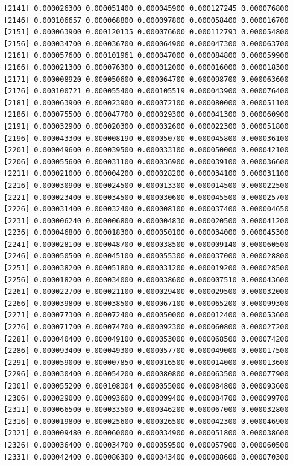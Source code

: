 \documentclass[]{article}
\begin{document}
\begin{verbatim}
 [2141] 0.000026300 0.000051400 0.000045900 0.000127245 0.000076800
 [2146] 0.000106657 0.000068800 0.000097800 0.000058400 0.000016700
 [2151] 0.000063900 0.000120135 0.000076600 0.000112793 0.000054800
 [2156] 0.000034700 0.000036700 0.000064900 0.000047300 0.000063700
 [2161] 0.000057600 0.000101961 0.000047000 0.000084800 0.000059900
 [2166] 0.000021300 0.000076300 0.000012000 0.000016000 0.000018300
 [2171] 0.000008920 0.000050600 0.000064700 0.000098700 0.000063600
 [2176] 0.000100721 0.000055400 0.000105519 0.000043900 0.000076400
 [2181] 0.000063900 0.000023900 0.000072100 0.000080000 0.000051100
 [2186] 0.000075500 0.000047700 0.000029300 0.000041300 0.000060900
 [2191] 0.000032900 0.000020300 0.000032600 0.000022300 0.000051800
 [2196] 0.000043300 0.000008190 0.000050700 0.000045800 0.000036100
 [2201] 0.000049600 0.000039500 0.000033100 0.000050000 0.000042100
 [2206] 0.000055600 0.000031100 0.000036900 0.000039100 0.000036600
 [2211] 0.000021000 0.000004200 0.000028200 0.000034100 0.000031100
 [2216] 0.000030900 0.000024500 0.000013300 0.000014500 0.000022500
 [2221] 0.000023400 0.000034500 0.000030600 0.000045500 0.000025700
 [2226] 0.000031400 0.000032400 0.000008100 0.000037400 0.000004650
 [2231] 0.000006240 0.000006800 0.000004830 0.000020500 0.000041200
 [2236] 0.000046800 0.000018300 0.000050100 0.000034000 0.000045300
 [2241] 0.000028100 0.000048700 0.000038500 0.000009140 0.000060500
 [2246] 0.000050500 0.000045100 0.000055300 0.000037000 0.000028800
 [2251] 0.000038200 0.000051800 0.000031200 0.000019200 0.000028500
 [2256] 0.000018200 0.000034000 0.000038600 0.000007510 0.000043600
 [2261] 0.000022700 0.000021100 0.000029400 0.000029500 0.000032000
 [2266] 0.000039800 0.000038500 0.000067100 0.000065200 0.000099300
 [2271] 0.000077300 0.000072400 0.000050000 0.000012400 0.000053600
 [2276] 0.000071700 0.000074700 0.000092300 0.000060800 0.000027200
 [2281] 0.000040400 0.000049100 0.000053000 0.000068500 0.000074200
 [2286] 0.000093400 0.000049300 0.000057700 0.000049000 0.000017500
 [2291] 0.000059000 0.000007850 0.000016500 0.000014000 0.000013600
 [2296] 0.000030400 0.000054200 0.000080800 0.000063500 0.000077900
 [2301] 0.000055200 0.000108304 0.000055000 0.000084800 0.000093600
 [2306] 0.000029000 0.000093600 0.000099400 0.000084700 0.000099700
 [2311] 0.000066500 0.000033500 0.000046200 0.000067000 0.000032800
 [2316] 0.000019800 0.000025600 0.000026500 0.000042300 0.000046900
 [2321] 0.000009480 0.000060000 0.000034900 0.000051800 0.000038600
 [2326] 0.000036400 0.000034700 0.000059500 0.000057900 0.000060500
 [2331] 0.000042400 0.000086300 0.000043400 0.000088600 0.000070300

\end{verbatim}
\end{document}
